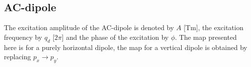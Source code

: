 %
%

\subsection{AC-dipole}
The excitation amplitude of the AC-dipole is denoted by $A$ [Tm], the excitation frequency by $q_d$ [$2\pi$] and the phase of the excitation by $\phi$. The map
presented here is for a purely horizontal dipole, the map for a vertical dipole is obtained by replacing $p_x\to p_y$.

